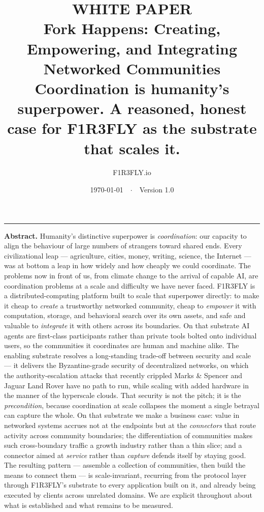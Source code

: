 \documentclass[11pt]{article}
\title{\vspace{-2.2em}
{\normalsize\sffamily\bfseries\color{accent}WHITE PAPER}\\[0.7em]
\textbf{Fork Happens: Creating, Empowering, and Integrating Networked Communities}\\[0.35em]
{\large\mdseries Coordination is humanity's superpower. A reasoned, honest case for F1R3FLY as the substrate that scales it.}}
\author{\normalsize F1R3FLY.io}
\date{\normalsize\today\ \ $\cdot$\ \ Version 1.0}
\begin{document}
\maketitle
\thispagestyle{fancy}
\vspace{-1em}
\hrule
\vspace{1.2em}

\noindent\textbf{\color{ink}Abstract.} Humanity's distinctive superpower is \emph{coordination}: our capacity to align the behaviour of large numbers of strangers toward shared ends. Every civilizational leap --- agriculture, cities, money, writing, science, the Internet --- was at bottom a leap in how widely and how cheaply we could coordinate. The problems now in front of us, from climate change to the arrival of capable AI, are coordination problems at a scale and difficulty we have never faced. F1R3FLY is a distributed-computing platform built to scale that superpower directly: to make it cheap to \emph{create} a trustworthy networked community, cheap to \emph{empower} it with computation, storage, and behavioral search over its own assets, and safe and valuable to \emph{integrate} it with others across its boundaries. On that substrate AI agents are first-class participants rather than private tools bolted onto individual users, so the communities it coordinates are human and machine alike. The enabling substrate resolves a long-standing trade-off between security and scale --- it delivers the Byzantine-grade security of decentralized networks, on which the authority-escalation attacks that recently crippled Marks \& Spencer and Jaguar Land Rover have no path to run, while scaling with added hardware in the manner of the hyperscale clouds. That security is not the pitch; it is the \emph{precondition}, because coordination at scale collapses the moment a single betrayal can capture the whole. On that substrate we make a business case: value in networked systems accrues not at the endpoints but at the \emph{connectors} that route activity across community boundaries; the differentiation of communities makes such cross-boundary traffic a growth industry rather than a thin slice; and a connector aimed at \emph{service} rather than \emph{capture} defends itself by staying good. The resulting pattern --- assemble a collection of communities, then build the means to connect them --- is scale-invariant, recurring from the protocol layer through F1R3FLY's substrate to every application built on it, and already being executed by clients across unrelated domains. We are explicit throughout about what is established and what remains to be measured.
\end{document}
